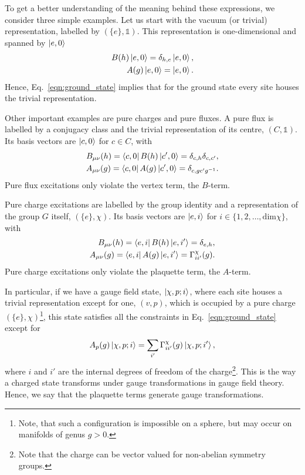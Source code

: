 \documentclass[a4paper,twocolumn,11pt, accepted=2024-06-14]{quantumarticle}
\begin{document}
To get a better understanding of the meaning behind these expressions, we consider three simple examples. Let us start with the vacuum (or trivial) representation, labelled by $(\{e\}, \mathbb{1})$. This representation is one-dimensional and spanned by $\ket{e, 0}$
\begin{equation}
    \begin{split}
        B{(h)}\ket{e, 0} = \delta_{h,e}\ket{e, 0},\\
        A{(g)}\ket{e, 0} = \ket{e,0}.
    \end{split}
\end{equation}
Hence, Eq.~\eqref{eqn:ground_state} implies that for the ground state every site houses the trivial representation.

Other important examples are pure charges and pure fluxes. A pure flux is labelled by a conjugacy class and the trivial representation of its centre, $(C, \mathbb{1})$. Its basis vectors are $\ket{c, 0}$ for $c \in C$, with
\begin{equation}
    \begin{split}
        B_{\mu\nu}{(h)}=\bra{c, 0} B{(h)} \ket{c', 0} = \delta_{c, h} \delta_{c, c'}, \\
        A_{\mu\nu}{(g)}= \bra{c, 0} A{(g)} \ket{c', 0} = \delta_{c,gc'g^{-1}}.
    \end{split}
\end{equation}
Pure flux excitations only violate the vertex term, the $B$-term.

Pure charge excitations are labelled by the group identity and a representation of the group $G$ itself, $(\{e\}, \chi)$. Its basis vectors are $\ket{e, i}$ for $i \in \{1, 2, \ldots, \text{dim}\chi\}$, with
\begin{equation}
    \begin{split}
        B_{\mu\nu}{(h)}=\bra{e, i} B{(h)} \ket{e, i'} = \delta_{e, h},\\
        A_{\mu\nu}{(g)} = \bra{e, i} A{(g)} \ket{e, i'} = \Gamma^\chi_{ii'}(g).
    \end{split}
\end{equation}
Pure charge excitations only violate the plaquette term, the $A$-term.



In particular, if we have a gauge field state, $\ket{\chi, p; i}$, where each site houses a trivial representation except for one, $(v, p)$, which is occupied by a pure charge $(\{e\}, \chi)$\footnote{Note, that such a configuration is impossible on a sphere, but may occur on manifolds of genus $g>0$.}, this state satisfies all the constraints in Eq.~\eqref{eqn:ground_state} except for
\begin{equation}
    A_p{(g)}\ket{\chi, p; i} = \sum_{i'} \Gamma^\chi_{ii'}(g)\ket{\chi, p; i'},\label{eqn:tranfs}
\end{equation}
where $i$ and $i'$ are the internal degrees of freedom of the charge\footnote{Note that the charge can be vector valued for non-abelian symmetry groups.}.
This is the way a charged state transforms under gauge transformations in gauge field theory. Hence, we say that the plaquette terms generate gauge transformations.
\end{document}
